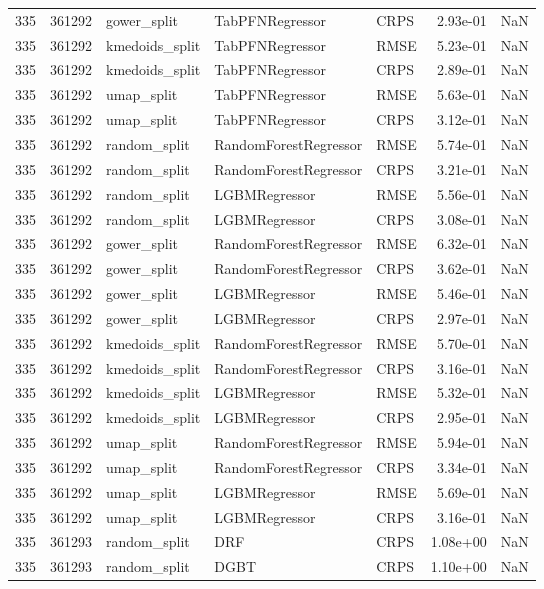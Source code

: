 \begin{tabular}{rrlllrr}
335 & 361292 & gower\_split & TabPFNRegressor & CRPS & 2.93e-01 & NaN \\
335 & 361292 & kmedoids\_split & TabPFNRegressor & RMSE & 5.23e-01 & NaN \\
335 & 361292 & kmedoids\_split & TabPFNRegressor & CRPS & 2.89e-01 & NaN \\
335 & 361292 & umap\_split & TabPFNRegressor & RMSE & 5.63e-01 & NaN \\
335 & 361292 & umap\_split & TabPFNRegressor & CRPS & 3.12e-01 & NaN \\
335 & 361292 & random\_split & RandomForestRegressor & RMSE & 5.74e-01 & NaN \\
335 & 361292 & random\_split & RandomForestRegressor & CRPS & 3.21e-01 & NaN \\
335 & 361292 & random\_split & LGBMRegressor & RMSE & 5.56e-01 & NaN \\
335 & 361292 & random\_split & LGBMRegressor & CRPS & 3.08e-01 & NaN \\
335 & 361292 & gower\_split & RandomForestRegressor & RMSE & 6.32e-01 & NaN \\
335 & 361292 & gower\_split & RandomForestRegressor & CRPS & 3.62e-01 & NaN \\
335 & 361292 & gower\_split & LGBMRegressor & RMSE & 5.46e-01 & NaN \\
335 & 361292 & gower\_split & LGBMRegressor & CRPS & 2.97e-01 & NaN \\
335 & 361292 & kmedoids\_split & RandomForestRegressor & RMSE & 5.70e-01 & NaN \\
335 & 361292 & kmedoids\_split & RandomForestRegressor & CRPS & 3.16e-01 & NaN \\
335 & 361292 & kmedoids\_split & LGBMRegressor & RMSE & 5.32e-01 & NaN \\
335 & 361292 & kmedoids\_split & LGBMRegressor & CRPS & 2.95e-01 & NaN \\
335 & 361292 & umap\_split & RandomForestRegressor & RMSE & 5.94e-01 & NaN \\
335 & 361292 & umap\_split & RandomForestRegressor & CRPS & 3.34e-01 & NaN \\
335 & 361292 & umap\_split & LGBMRegressor & RMSE & 5.69e-01 & NaN \\
335 & 361292 & umap\_split & LGBMRegressor & CRPS & 3.16e-01 & NaN \\
335 & 361293 & random\_split & DRF & CRPS & 1.08e+00 & NaN \\
335 & 361293 & random\_split & DGBT & CRPS & 1.10e+00 & NaN \\

\end{tabular}

